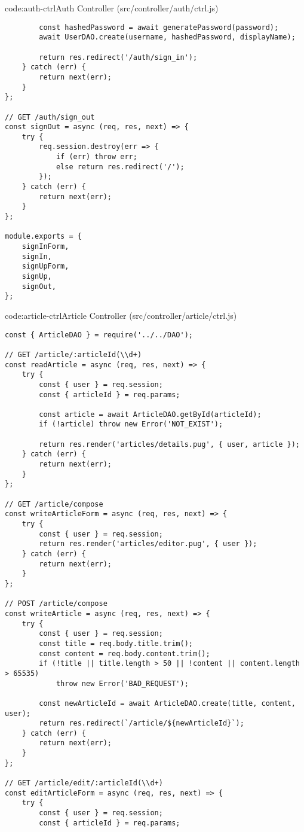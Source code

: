\begin{code}{code:auth-ctrl}{Auth Controller (src/controller/auth/ctrl.js)}
\begin{verbatim}
        const hashedPassword = await generatePassword(password);
        await UserDAO.create(username, hashedPassword, displayName);

        return res.redirect('/auth/sign_in');
    } catch (err) {
        return next(err);
    }
};

// GET /auth/sign_out
const signOut = async (req, res, next) => {
    try {
        req.session.destroy(err => {
            if (err) throw err;
            else return res.redirect('/');
        });
    } catch (err) {
        return next(err);
    }
};

module.exports = {
    signInForm,
    signIn,
    signUpForm,
    signUp,
    signOut,
};
\end{verbatim}
\end{code}

\begin{code}{code:article-ctrl}{Article Controller (src/controller/article/ctrl.js)}
\begin{verbatim}
const { ArticleDAO } = require('../../DAO');

// GET /article/:articleId(\\d+)
const readArticle = async (req, res, next) => {
    try {
        const { user } = req.session;
        const { articleId } = req.params;

        const article = await ArticleDAO.getById(articleId);
        if (!article) throw new Error('NOT_EXIST');

        return res.render('articles/details.pug', { user, article });
    } catch (err) {
        return next(err);
    }
};

// GET /article/compose
const writeArticleForm = async (req, res, next) => {
    try {
        const { user } = req.session;
        return res.render('articles/editor.pug', { user });
    } catch (err) {
        return next(err);
    }
};

// POST /article/compose
const writeArticle = async (req, res, next) => {
    try {
        const { user } = req.session;
        const title = req.body.title.trim();
        const content = req.body.content.trim();
        if (!title || title.length > 50 || !content || content.length > 65535)
            throw new Error('BAD_REQUEST');

        const newArticleId = await ArticleDAO.create(title, content, user);
        return res.redirect(`/article/${newArticleId}`);
    } catch (err) {
        return next(err);
    }
};

// GET /article/edit/:articleId(\\d+)
const editArticleForm = async (req, res, next) => {
    try {
        const { user } = req.session;
        const { articleId } = req.params;


\end{verbatim}
\end{code}
